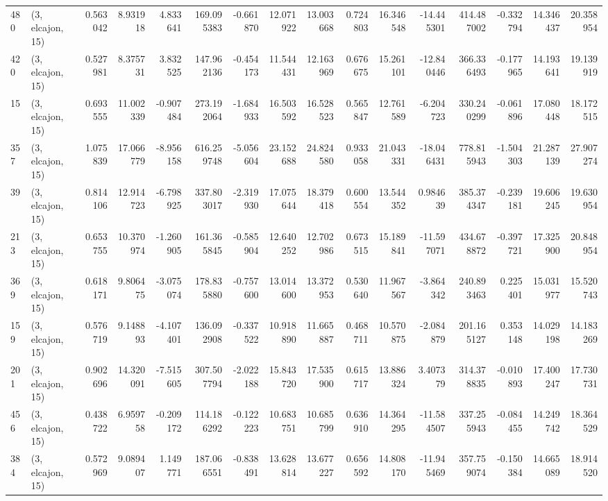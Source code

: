 \begin{tabular}{llrrrrrrrrrrrrrr}
480 &  (3, elcajon, 15) &   0.563042 &   8.931918 &   4.833641 &   169.095383 &  -0.661870 &  12.071922 &  13.003668 &  0.724803 &  16.346548 & -14.445301 &   414.487002 & -0.332794 &  14.346437 &  20.358954 \\
420 &  (3, elcajon, 15) &   0.527981 &   8.375731 &   3.832525 &   147.962136 &  -0.454173 &  11.544431 &  12.163969 &  0.676675 &  15.261101 & -12.840446 &   366.336493 & -0.177965 &  14.193641 &  19.139919 \\
15  &  (3, elcajon, 15) &   0.693555 &  11.002339 &  -0.907484 &   273.192064 &  -1.684933 &  16.503592 &  16.528523 &  0.565847 &  12.761589 &  -6.204723 &   330.240299 & -0.061896 &  17.080448 &  18.172515 \\
357 &  (3, elcajon, 15) &   1.075839 &  17.066779 &  -8.956158 &   616.259748 &  -5.056604 &  23.152688 &  24.824580 &  0.933058 &  21.043331 & -18.046431 &   778.815943 & -1.504303 &  21.287139 &  27.907274 \\
39  &  (3, elcajon, 15) &   0.814106 &  12.914723 &  -6.798925 &   337.803017 &  -2.319930 &  17.075644 &  18.379418 &  0.600554 &  13.544352 &   0.984639 &   385.374347 & -0.239181 &  19.606245 &  19.630954 \\
213 &  (3, elcajon, 15) &   0.653755 &  10.370974 &  -1.260905 &   161.365845 &  -0.585904 &  12.640252 &  12.702986 &  0.673515 &  15.189841 & -11.597071 &   434.678872 & -0.397721 &  17.325900 &  20.848954 \\
369 &  (3, elcajon, 15) &   0.618171 &   9.806475 &  -3.075074 &   178.835880 &  -0.757600 &  13.014600 &  13.372953 &  0.530640 &  11.967567 &  -3.864342 &   240.893463 &  0.225401 &  15.031977 &  15.520743 \\
159 &  (3, elcajon, 15) &   0.576719 &   9.148893 &  -4.107401 &   136.092908 &  -0.337522 &  10.918890 &  11.665887 &  0.468711 &  10.570875 &  -2.084879 &   201.165127 &  0.353148 &  14.029198 &  14.183269 \\
201 &  (3, elcajon, 15) &   0.902696 &  14.320091 &  -7.515605 &   307.507794 &  -2.022188 &  15.843720 &  17.535900 &  0.615717 &  13.886324 &   3.407379 &   314.378835 & -0.010893 &  17.400247 &  17.730731 \\
456 &  (3, elcajon, 15) &   0.438722 &   6.959758 &  -0.209172 &   114.186292 &  -0.122223 &  10.683751 &  10.685799 &  0.636910 &  14.364295 & -11.584507 &   337.255943 & -0.084455 &  14.249742 &  18.364529 \\
384 &  (3, elcajon, 15) &   0.572969 &   9.089407 &   1.149771 &   187.066551 &  -0.838491 &  13.628814 &  13.677227 &  0.656592 &  14.808170 & -11.945469 &   357.759074 & -0.150384 &  14.665089 &  18.914520 \\

\end{tabular}
